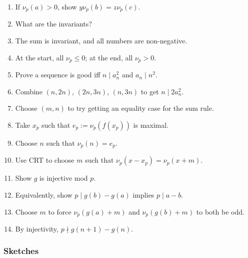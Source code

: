 \documentclass[11pt,paper=letter]{scrartcl}
\begin{document}
\begin{enumerate}
\item \label{h:13-3} If $\nu_p(a) > 0$, show $y\nu_p(b) = z\nu_p(c)$.

\item \label{h:14-1} What are the invariants?

\item \label{h:14-2} The sum is invariant, and all numbers are non-negative.

\item \label{h:14-3} At the start, all $\nu_p \le 0$; at the end, all $\nu_p > 0$.

\item \label{h:15-1} Prove a sequence is good iff $n \mid a_n^2$ and $a_n \mid n^2$.

\item \label{h:15-2} Combine $(n, 2n)$, $(2n, 3n)$, $(n, 3n)$ to get $n \mid 2a_n^2$.

\item \label{h:15-3} Choose $(m, n)$ to try getting an equality case for the sum rule.

\item \label{h:16-1} Take $x_p$ such that $e_p := \nu_p(f(x_p))$ is maximal.

\item \label{h:16-2} Choose $n$ such that $\nu_p(n) = e_p$.

\item \label{h:16-3} Use CRT to choose $m$ such that $\nu_p(x - x_p) = \nu_p(x + m)$.

\item \label{h:17-1} Show $g$ is injective mod $p$.

\item \label{h:17-2} Equivalently, show $p \mid g(b) - g(a)$ implies $p \mid a - b$.

\item \label{h:17-3} Choose $m$ to force $\nu_p(g(a) + m)$ and $\nu_p(g(b) + m)$ to both be odd.

\item \label{h:17-4} By injectivity, $p \nmid g(n+1) - g(n)$.

\end{enumerate}



\newpage
\subsubsection*{Sketches}
\end{document}
